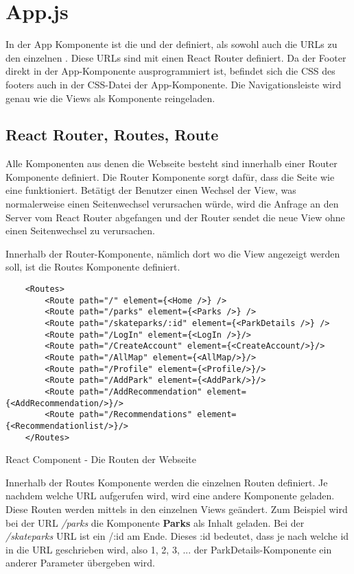 \section{App.js}
\label{appDatei}

In der App Komponente ist die  und der  definiert, 
als sowohl auch die URLs zu den einzelnen . Diese URLs sind mit einen React 
Router definiert. Da der Footer direkt in der App-Komponente ausprogrammiert ist, 
befindet sich die CSS des footers auch in der CSS-Datei der App-Komponente. Die Navigationsleiste wird genau 
wie die Views als Komponente reingeladen.

\subsection{React Router, Routes, Route}
Alle Komponenten aus denen die Webseite besteht sind innerhalb einer Router Komponente definiert. Die 
Router Komponente sorgt dafür, dass die Seite wie eine  funktioniert. Betätigt
der Benutzer einen Wechsel der View, was normalerweise einen Seitenwechsel verursachen würde, wird die 
Anfrage an den Server vom React Router abgefangen und der Router sendet die neue View ohne einen 
Seitenwechsel zu verursachen. 


Innerhalb der Router-Komponente, nämlich dort wo die View angezeigt werden soll, ist die Routes
Komponente definiert.
\begin{code}[htp]
\begin{lstlisting}
    <Routes>
        <Route path="/" element={<Home />} />
        <Route path="/parks" element={<Parks />} />
        <Route path="/skateparks/:id" element={<ParkDetails />} />
        <Route path="/LogIn" element={<LogIn />}/>
        <Route path="/CreateAccount" element={<CreateAccount/>}/>
        <Route path="/AllMap" element={<AllMap/>}/>
        <Route path="/Profile" element={<Profile/>}/>
        <Route path="/AddPark" element={<AddPark/>}/>
        <Route path="/AddRecommendation" element={<AddRecommendation/>}/>
        <Route path="/Recommendations" element={<Recommendationlist/>}/>
    </Routes>
\end{lstlisting} 
\caption{React Component - Die Routen der Webseite}
\end{code}
Innerhalb der Routes Komponente werden die einzelnen Routen definiert. Je nachdem welche URL aufgerufen wird,
wird eine andere Komponente geladen. Diese Routen werden mittels  in den einzelnen 
Views geändert. Zum Beispiel wird bei der URL \textit{/parks} die Komponente \textbf{Parks} als 
Inhalt geladen. Bei der \textit{/skateparks} URL ist ein /:id am Ende. Dieses :id 
bedeutet, dass je nach welche id in die URL geschrieben wird, also 1, 2, 3, ... der 
ParkDetails-Komponente ein anderer Parameter übergeben wird. 


